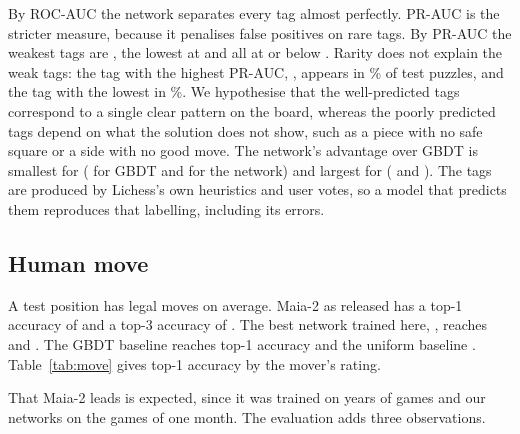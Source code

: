 \documentclass[11pt]{article}
\begin{document}
By ROC-AUC the network separates every tag almost perfectly. PR-AUC is the
stricter measure, because it penalises false positives on rare tags. By
PR-AUC the  weakest tags are
, the lowest at
 and all at or below
. Rarity does not explain the
weak tags: the tag with the highest PR-AUC,
, appears in
\% of test puzzles, and the tag
with the lowest in \%. We
hypothesise that the well-predicted tags correspond to a single clear
pattern on the board, whereas the poorly predicted tags depend on what the
solution does not show, such as a piece with no safe square or a side with
no good move. The network's advantage over GBDT is smallest for
( for GBDT and
 for the network) and largest
for 
( and
). The tags are produced by
Lichess's own heuristics and user votes, so a model that predicts them
reproduces that labelling, including its errors.

\subsection{Human move}
\label{sec:human-move}

A test position has  legal moves on average.
Maia-2 as released has a top-1 accuracy of  and
a top-3 accuracy of . The best network trained
here, , reaches  and
. The GBDT baseline reaches
 top-1 accuracy and the uniform baseline
. Table~\ref{tab:move} gives top-1 accuracy by the
mover's rating.

\begin{table}[htbp]\centering\small
{}
\caption{Human move: top-1 accuracy of each model by the mover's rating.}
\label{tab:move}
\end{table}

That Maia-2 leads is expected, since it was trained on years of games and
our networks on the games of one month. The evaluation adds three
observations.
\end{document}
